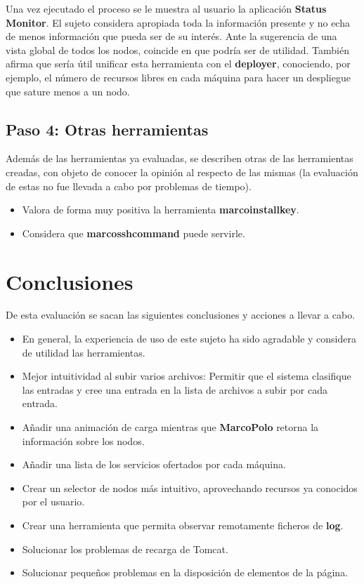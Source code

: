 Una vez ejecutado el proceso se le muestra al usuario la aplicación \textbf{Status Monitor}. El sujeto considera apropiada toda la información presente y no echa de menos información que pueda ser de su interés. Ante la sugerencia de una vista global de todos los nodos, coincide en que podría ser de utilidad. También afirma que sería útil unificar esta herramienta con el \textbf{deployer}, conociendo, por ejemplo, el número de recursos libres en cada máquina para hacer un despliegue que sature menos a un nodo.

\subsection{Paso 4: Otras herramientas}

Además de las herramientas ya evaluadas, se describen otras de las herramientas creadas, con objeto de conocer la opinión al respecto de las mismas (la evaluación de estas no fue llevada a cabo por problemas de tiempo).

\begin{itemize}
	\item Valora de forma muy positiva la herramienta \textbf{marcoinstallkey}.
	\item Considera que \textbf{marcosshcommand} puede servirle.
\end{itemize}

\section{Conclusiones}
De esta evaluación se sacan las siguientes conclusiones y acciones a llevar a cabo.
	\begin{itemize}
	\item En general, la experiencia de uso de este sujeto ha sido agradable y considera de utilidad las herramientas.
	\item Mejor intuitividad al subir varios archivos: Permitir que el sistema clasifique las entradas y cree una entrada en la lista de archivos a subir por cada entrada.
	\item Añadir una animación de carga mientras que \textbf{MarcoPolo} retorna la información sobre los nodos.
	\item Añadir una lista de los servicios ofertados por cada máquina.
	\item Crear un selector de nodos más intuitivo, aprovechando recursos ya conocidos por el usuario.
	\item Crear una herramienta que permita observar remotamente ficheros de \textbf{log}.
	\item Solucionar los problemas de recarga de Tomcat.
	\item Solucionar pequeños problemas en la disposición de elementos de la página.
	\end{itemize}
